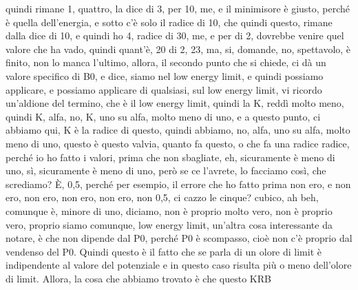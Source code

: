 \begin{soluzione}
quindi rimane 1, quattro, la dice di 3, per 10, me, e il minimisore è giusto, perché è quella dell'energia, e sotto c'è solo il radice di 10, che quindi questo, rimane dalla dice di 10, e quindi ho 4, radice di 30, me, e per di 2, dovrebbe venire quel valore che ha vado, quindi quant'è, 20 di 2, 23, ma, si, domande, no, spettavolo, è finito, non lo manca l'ultimo, allora, il secondo punto che si chiede, ci dà un valore specifico di B0, e dice, siamo nel low energy limit, e quindi possiamo applicare, e possiamo applicare di qualsiasi, sul low energy limit, vi ricordo un'aldione del termino, che è il low energy limit, quindi la K, reddì molto meno, quindi K, alfa, no, K, uno su alfa, molto meno di uno, e a questo punto, ci abbiamo qui, K è la radice di questo, quindi abbiamo, no, alfa, uno su alfa, molto meno di uno, questo è questo valvia, quanto fa questo, o che fa una radice radice, perché io ho fatto i valori, prima che non sbagliate, eh, sicuramente è meno di uno, sì, sicuramente è meno di uno, però se ce l'avrete, lo facciamo così, che scrediamo? È, 0,5, perché per esempio, il errore che ho fatto prima non ero, e non ero, non ero, non ero, non ero, non 0,5, ci cazzo le cinque? cubico, ah beh, comunque è, minore di uno, diciamo, non è proprio molto vero, non è proprio vero, proprio siamo comunque, low energy limit, un'altra cosa interessante da notare, è che non dipende dal P0, perché P0 è scompasso, cioè non c'è proprio dal vendenso del P0. Quindi questo è il fatto che se parla di un olore di limit è indipendente al valore del potenziale e in questo caso risulta più o meno dell'olore di limit. Allora, la cosa che abbiamo trovato è che questo KRB
   

\end{soluzione}

